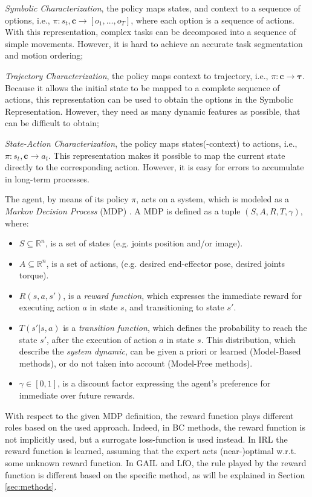 \begin{enumerate*}[label=(\textbf{\alph*})]
    \item \textit{Symbolic Characterization}, the policy maps states, and context to a sequence of options, i.e., $\pi: s_{t}, \textbf{c} \rightarrow [o_1, \dots, o_T]$, where each option is a sequence of actions. With this representation, complex tasks can be decomposed into a sequence of simple movements. However, it is hard to achieve an accurate task segmentation and motion ordering;
    \item \textit{Trajectory Characterization}, the policy maps context to trajectory, i.e., $\pi: \mathbf{c} \rightarrow \boldsymbol{\tau}$. Because it allows the initial state to be mapped to a complete sequence of actions, this representation can be used to obtain the options in the Symbolic Representation. However, they need as many dynamic features as possible, that can be difficult to obtain;
    \item \textit{State-Action Characterization}, the policy maps states(-context) to actions, i.e., $\pi: s_{t}, \textbf{c} \rightarrow a_{t}$. This representation makes it possible to map the current state directly to the corresponding action. However, it is easy for errors to accumulate in long-term processes.
\end{enumerate*}
\newline The agent, by means of its policy $\pi$, acts on a system, which is modeled as a \textit{Markov Decision Process} (MDP) \cite{kroemer2021review_robot_learning}. A MDP is defined as a tuple $(S,A,R,T,\gamma)$, where:
\begin{itemize}
    \item $S \subseteq \mathbb{R}^{n}$, is a set of states (e.g. joints position and/or image).
    \item $A \subseteq \mathbb{R}^{n}$, is a set of actions, (e.g. desired end-effector pose, desired joints torque).
    \item $R(s,a,s')$, is a \textit{reward function}, which expresses the immediate reward for executing action $a$ in state $s$, and transitioning to state $s'$.
    \item $T(s'|s,a)$ is a \textit{transition function}, which defines the probability to reach the state $s'$, after the execution of action $a$ in state $s$. This distribution, which describe the \textit{system dynamic}, can be given a priori or learned (Model-Based methods), or do not taken into account (Model-Free methods).
    \item $\gamma \in [0,1]$, is a discount factor expressing the agent's preference for immediate over future rewards.
\end{itemize}
With respect to the given MDP definition, the reward function plays different roles based on the used approach. Indeed, in BC methods, the reward function is not implicitly used, but a surrogate loss-function is used instead. In IRL the reward function is learned, assuming that the expert acts (near-)optimal w.r.t. some unknown reward function. In GAIL and LfO, the rule played by the reward function is different based on the specific method, as will be explained in Section \ref{sec:methods}.